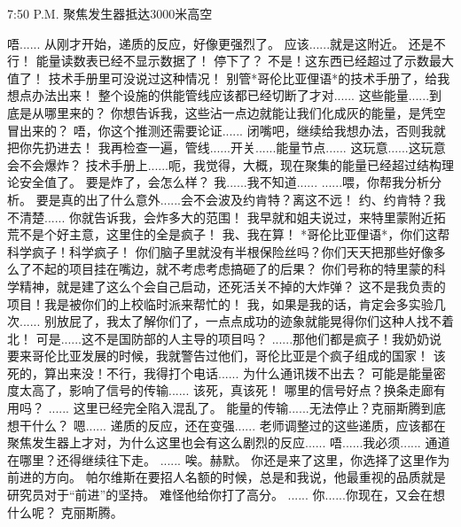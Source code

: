 \documentclass[openany]{book}
\begin{document}
7:50 P.M. 聚焦发生器抵达3000米高空
\begin{dialogue}
     唔......
     从刚才开始，递质的反应，好像更强烈了。
     应该......就是这附近。
     还是不行！
     能量读数表已经不显示数据了！
     停下了？
     不是！这东西已经超过了示数最大值了！
     技术手册里可没说过这种情况！
     别管*哥伦比亚俚语*的技术手册了，给我想点办法出来！
     整个设施的供能管线应该都已经切断了才对......
     这些能量......到底是从哪里来的？
     你想告诉我，这些沾一点边就能让我们化成灰的能量，是凭空冒出来的？
     唔，你这个推测还需要论证......
     闭嘴吧，继续给我想办法，否则我就把你先扔进去！
     我再检查一遍，管线......开关......能量节点......
     这玩意......这玩意会不会爆炸？
     技术手册上......呃，我觉得，大概，现在聚集的能量已经超过结构理论安全值了。
     要是炸了，会怎么样？
     我......我不知道......
     ......喂，你帮我分析分析。
     要是真的出了什么意外......会不会波及约肯特？离这不远！
     约、约肯特？我不清楚......
     你就告诉我，会炸多大的范围！
     我早就和姐夫说过，来特里蒙附近拓荒不是个好主意，这里住的全是疯子！
     我、我在算！
     *哥伦比亚俚语*，你们这帮科学疯子！科学疯子！
     你们脑子里就没有半根保险丝吗？你们天天把那些好像多么了不起的项目挂在嘴边，就不考虑考虑搞砸了的后果？
     你们号称的特里蒙的科学精神，就是建了这么个会自己启动，还死活关不掉的大炸弹？
     这不是我负责的项目！我是被你们的上校临时派来帮忙的！
     我，如果是我的话，肯定会多实验几次......
     别放屁了，我太了解你们了，一点点成功的迹象就能晃得你们这种人找不着北！
     可是......这不是国防部的人主导的项目吗？
     ......那他们都是疯子！我奶奶说要来哥伦比亚发展的时候，我就警告过他们，哥伦比亚是个疯子组成的国家！
     该死的，算出来没！不行，我得打个电话......
     为什么通讯拨不出去？
     可能是能量密度太高了，影响了信号的传输......
     该死，真该死！
     哪里的信号好点？换条走廊有用吗？
     ......
     这里已经完全陷入混乱了。
     能量的传输......无法停止？克丽斯腾到底想干什么？
     嗯......
     递质的反应，还在变强......
     老师调整过的这些递质，应该都在聚焦发生器上才对，为什么这里也会有这么剧烈的反应......
     唔......我必须......
     通道在哪里？还得继续往下走。
     ......
     唉。赫默。
     你还是来了这里，你选择了这里作为前进的方向。
     帕尔维斯在要招人名额的时候，总是和我说，他最重视的品质就是研究员对于“前进”的坚持。
     难怪他给你打了高分。
     ......
     你......你现在，又会在想什么呢？
     克丽斯腾。
\end{dialogue}
\end{document}
